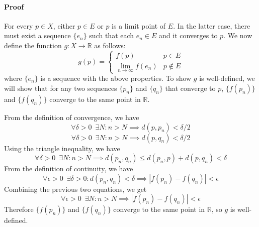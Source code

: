 \documentclass[11pt,letterpaper]{article}
\begin{document}
\paragraph{Proof} For every $p \in X$, either $p \in E$ or $p$ is a limit point of $E$. In the latter case, there must exist a sequence $\{e_n\}$ such that each $e_n \in E$ and it converges to $p$. We now define the function $g: X \rightarrow \mathbb{R}$ as follows:
\[ g(p) = \begin{cases}f(p) & p \in E \\ \lim_{n \rightarrow \infty}f(e_n) & p \notin E \end{cases} \]
where $\{e_n\}$ is a sequence with the above properties. To show $g$ is well-defined, we will show that for any two sequences $\{p_n\}$ and $\{q_n\}$ that converge to $p$, $\{f(p_n)\}$ and $\{f(q_n)\}$ converge to the same point in $\mathbb{R}$.

From the definition of convergence, we have 
\[ \forall\delta>0 \,\,\, \exists N : n > N \implies d(p,p_n) < \delta/2 \]
\[ \forall\delta>0 \,\,\, \exists N : n > N \implies d(p,q_n) < \delta/2 \]
Using the triangle inequality, we have
\[ \forall\delta>0 \,\,\, \exists N : n > N \implies d(p_n,q_n) \leq d(p_n,p) + d(p,q_n) < \delta\]
From the definition of continuity, we have
\[ \forall\epsilon>0 \,\,\, \exists\delta>0 : d(p_n,q_n) < \delta \implies |f(p_n)-f(q_n)|<\epsilon \]
Combining the previous two equations, we get
\[ \forall\epsilon>0 \,\,\, \exists N : n > N \implies |f(p_n)-f(q_n)|<\epsilon \]
Therefore $\{f(p_n)\}$ and $\{f(q_n)\}$ converge to the same point in $\mathbb{R}$, so $g$ is well-defined.
\end{document}
